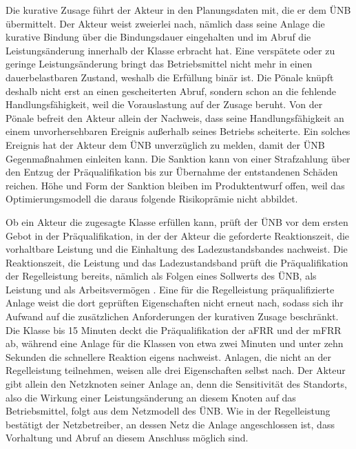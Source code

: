Die kurative Zusage führt der Akteur in den Planungsdaten mit, die er dem \ac{ÜNB} übermittelt.
Der Akteur weist zweierlei nach, nämlich dass seine Anlage die kurative Bindung über die Bindungsdauer eingehalten und im Abruf die Leistungsänderung innerhalb der Klasse erbracht hat.
Eine verspätete oder zu geringe Leistungsänderung bringt das Betriebsmittel nicht mehr in einen dauerbelastbaren Zustand, weshalb die Erfüllung binär ist.
Die Pönale knüpft deshalb nicht erst an einen gescheiterten Abruf, sondern schon an die fehlende Handlungsfähigkeit, weil die Vorauslastung auf der Zusage beruht.
Von der Pönale befreit den Akteur allein der Nachweis, dass seine Handlungsfähigkeit an einem unvorhersehbaren Ereignis außerhalb seines Betriebs scheiterte.
Ein solches Ereignis hat der Akteur dem \ac{ÜNB} unverzüglich zu melden, damit der \ac{ÜNB} Gegenmaßnahmen einleiten kann.
Die Sanktion kann von einer Strafzahlung über den Entzug der Präqualifikation bis zur Übernahme der entstandenen Schäden reichen.
Höhe und Form der Sanktion bleiben im Produktentwurf offen, weil das Optimierungsmodell die daraus folgende Risikoprämie nicht abbildet.

Ob ein Akteur die zugesagte Klasse erfüllen kann, prüft der \ac{ÜNB} vor dem ersten Gebot in der Präqualifikation, in der der Akteur die geforderte Reaktionszeit, die vorhaltbare Leistung und die Einhaltung des Ladezustandsbandes nachweist.
Die Reaktionszeit, die Leistung und das Ladezustandsband prüft die Präqualifikation der Regelleistung bereits, nämlich als Folgen eines Sollwerts des \ac{ÜNB}, als Leistung und als Arbeitsvermögen \cite{ubertragungsnetzbetreiber_deutschland_praqualifikationsverfahren_2024}.
Eine für die Regelleistung präqualifizierte Anlage weist die dort geprüften Eigenschaften nicht erneut nach, sodass sich ihr Aufwand auf die zusätzlichen Anforderungen der kurativen Zusage beschränkt.
Die Klasse bis 15 Minuten deckt die Präqualifikation der \ac{aFRR} und der \ac{mFRR} ab, während eine Anlage für die Klassen von etwa zwei Minuten und unter zehn Sekunden die schnellere Reaktion eigens nachweist.
Anlagen, die nicht an der Regelleistung teilnehmen, weisen alle drei Eigenschaften selbst nach.
Der Akteur gibt allein den Netzknoten seiner Anlage an, denn die Sensitivität des Standorts, also die Wirkung einer Leistungsänderung an diesem Knoten auf das Betriebsmittel, folgt aus dem Netzmodell des \ac{ÜNB}.
Wie in der Regelleistung bestätigt der Netzbetreiber, an dessen Netz die Anlage angeschlossen ist, dass Vorhaltung und Abruf an diesem Anschluss möglich sind.

